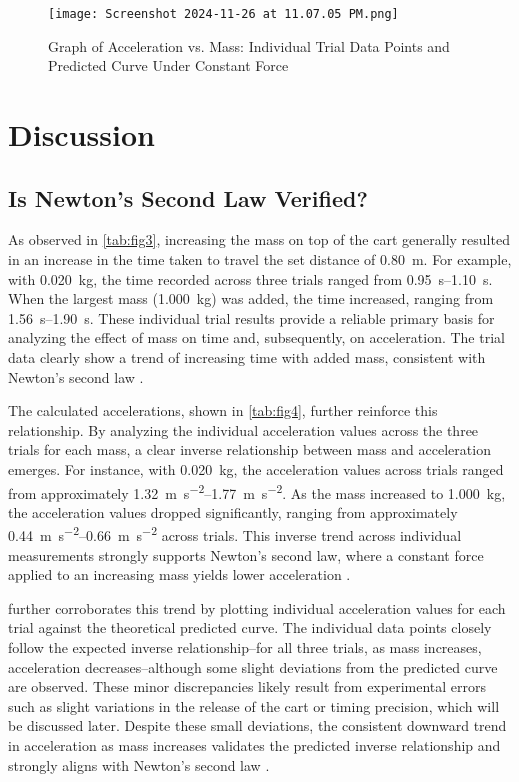 ﻿\documentclass[reprint,amsmath,amssymb,aps]{revtex4-2}
\begin{document}
\begin{figure}
\begin{center}
\texttt{[image: Screenshot 2024-11-26 at 11.07.05 PM.png]}
\end{center}
\caption{\label{fig:5}Graph of Acceleration vs. Mass: Individual Trial Data Points and Predicted Curve Under Constant Force}
\end{figure}








\section{Discussion}

\subsection{Is Newton’s Second Law Verified?}
As observed in \cref{tab:fig3}, increasing the mass on top of the cart generally resulted in an increase in the time taken to travel the set distance of \qty{0.80}{\meter}. For example, with \qty{0.020}{\kilo\gram}, the time recorded across three trials ranged from \qtyrange{0.95}{1.10}{\second}. When the largest mass (\qty{1.000}{\kilo\gram}) was added, the time increased, ranging from \qtyrange{1.56}{1.90}{\second}. These individual trial results provide a reliable primary basis for analyzing the effect of mass on time and, subsequently, on acceleration. The trial data clearly show a trend of increasing time with added mass, consistent with Newton’s second law \cite{knight2017physics}.

The calculated accelerations, shown in \cref{tab:fig4}, further reinforce this relationship. By analyzing the individual acceleration values across the three trials for each mass, a clear inverse relationship between mass and acceleration emerges. For instance, with \qty{0.020}{\kilo\gram}, the acceleration values across trials ranged from approximately \qtyrange{1.32}{1.77}{\meter\per\second\squared}. As the mass increased to \qty{1.000}{\kilo\gram}, the acceleration values dropped significantly, ranging from approximately \qtyrange{0.44}{0.66}{\meter\per\second\squared} across trials. This inverse trend across individual measurements strongly supports Newton’s second law, where a constant force applied to an increasing mass yields lower acceleration \cite{knight2017physics}. 

 further corroborates this trend by plotting individual acceleration values for each trial against the theoretical predicted curve. The individual data points closely follow the expected inverse relationship–for all three trials, as mass increases, acceleration decreases–although some slight deviations from the predicted curve are observed. These minor discrepancies likely result from experimental errors such as slight variations in the release of the cart or timing precision, which will be discussed later. Despite these small deviations, the consistent downward trend in acceleration as mass increases validates the predicted inverse relationship and strongly aligns with Newton’s second law \cite{knight2017physics}.
\end{document}
